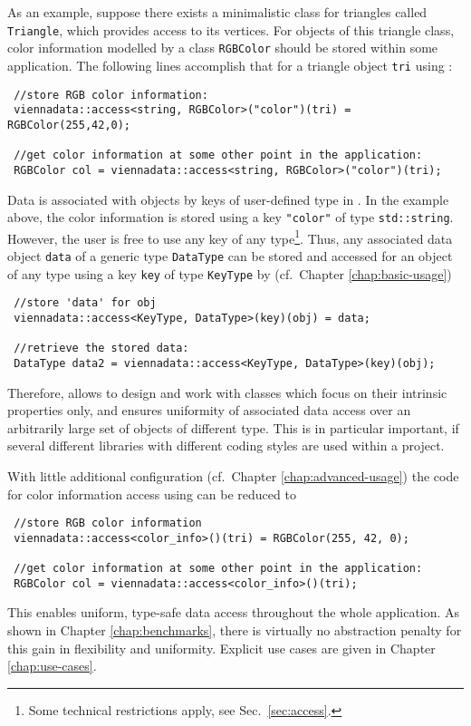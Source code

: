 As an example, suppose there exists a minimalistic class for triangles called \lstinline|Triangle|, 
which provides access to its vertices. For objects of this triangle class, color information modelled by a class \lstinline|RGBColor| should be stored within some application.
The following lines accomplish that for a triangle object \lstinline|tri| using {\ViennaData}:
\begin{lstlisting}
 //store RGB color information:
 viennadata::access<string, RGBColor>("color")(tri) = RGBColor(255,42,0);

 //get color information at some other point in the application:
 RGBColor col = viennadata::access<string, RGBColor>("color")(tri);
\end{lstlisting}
Data is associated with objects by keys of user-defined type in {\ViennaData}. In the example above,
the color information is stored using a key \lstinline|"color"| of type \lstinline|std::string|.
However, the user is free to use any key of any type\footnote{Some technical restrictions apply, see Sec.~\ref{sec:access}.}.
Thus, any associated data object \lstinline|data| of a generic type \lstinline|DataType| can be stored and accessed for an object of any type using a key \lstinline|key| of type \lstinline|KeyType|
by (cf.~Chapter \ref{chap:basic-usage})
\begin{lstlisting}
 //store 'data' for obj
 viennadata::access<KeyType, DataType>(key)(obj) = data;

 //retrieve the stored data:
 DataType data2 = viennadata::access<KeyType, DataType>(key)(obj);
\end{lstlisting}
Therefore, {\ViennaData} allows to design and work with classes which focus on their intrinsic properties only, and 
ensures uniformity of associated data access over an arbitrarily large set of objects of different type.
This is in particular important, if several different libraries with different coding styles are used within a project.

With little additional configuration (cf.~Chapter \ref{chap:advanced-usage}) the code for color information access using {\ViennaData} can be reduced to
\begin{lstlisting}
 //store RGB color information
 viennadata::access<color_info>()(tri) = RGBColor(255, 42, 0);

 //get color information at some other point in the application:
 RGBColor col = viennadata::access<color_info>()(tri);
\end{lstlisting}
This enables uniform, type-safe data access throughout the whole application.
As shown in Chapter \ref{chap:benchmarks}, there is virtually no abstraction penalty for this gain in flexibility and uniformity. Explicit use cases are given in Chapter \ref{chap:use-cases}.

